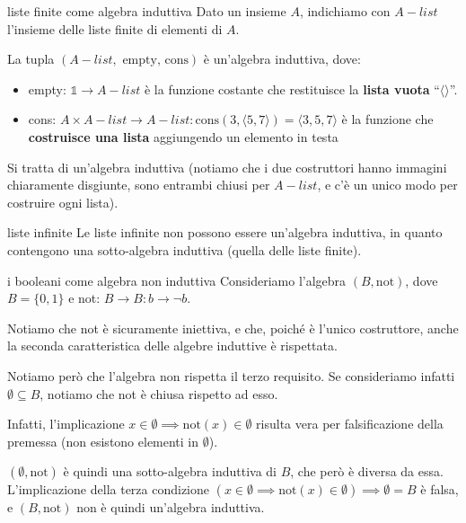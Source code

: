 \documentclass[a4paper,11pt]{report}
\begin{document}
\begin{gbox}{liste finite come algebra induttiva}
    Dato un insieme \( A \), indichiamo con \( A-list \) l'insieme delle liste finite di elementi di \( A \).

    La tupla \( (A-list,\text{ empty, cons}) \) è un'algebra induttiva, dove:
    \begin{itemize}
        \item empty: \( \mathbb{1} \to A-list \) è la funzione costante che restituisce la \textbf{lista vuota} ``\(\langle \rangle\)''.
        \item cons: \( A \times A-list \to A-list : \text{cons}(3, \langle 5, 7 \rangle) = \langle 3, 5, 7 \rangle \) è la funzione che \textbf{costruisce una lista} aggiungendo un elemento in testa
    \end{itemize}

    Si tratta di un'algebra induttiva (notiamo che i due costruttori hanno immagini chiaramente disgiunte, sono entrambi chiusi per \( A-list \), e c'è un unico modo per costruire ogni lista).

    \begin{gbox}[colframe=Mahogany, colbacktitle=Mahogany]{liste infinite}
        Le liste infinite non possono essere un'algebra induttiva, in quanto contengono una sotto-algebra induttiva (quella delle liste finite).
    \end{gbox}
\end{gbox}

\begin{gbox}[colframe=Orchid, colbacktitle=Orchid]{i booleani come algebra non induttiva}
    Consideriamo l'algebra \( (B, \text{not}) \), dove \( B = \{0, 1\} \) e not: \(B \to B : b\to \neg b\).

    Notiamo che not è sicuramente iniettiva, e che, poiché è l'unico costruttore, anche la seconda caratteristica delle algebre induttive è rispettata.

    Notiamo però che l'algebra non rispetta il terzo requisito. Se consideriamo infatti \( \emptyset \subseteq B\), notiamo che not è chiusa rispetto ad esso. 

    Infatti, l'implicazione \( x \in \emptyset \implies \text{not}(x) \in \emptyset \) risulta vera per falsificazione della premessa (non esistono elementi in \( \emptyset \)).

    \( (\emptyset, \text{not}) \) è quindi una sotto-algebra induttiva di \( B \), che però è diversa da essa. L'implicazione della terza condizione \( (x \in \emptyset \implies \text{not}(x) \in \emptyset) \implies \emptyset = B \) è falsa, e \( (B, \text{not}) \) non è quindi un'algebra induttiva.
\end{gbox}
\end{document}
